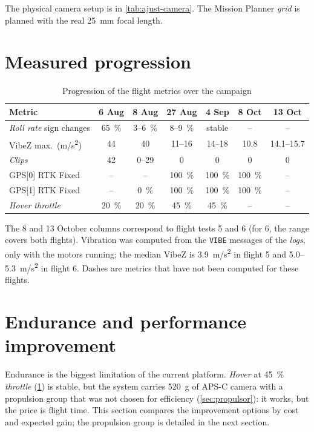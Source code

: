The physical camera setup is in \cref{tab:ajust-camera}. The Mission Planner \emph{grid} is planned with the real 25~mm focal length.

\section{Measured progression}
\label{sec:progressio-mesurada}

\begin{table}[H]
    \centering
    \caption{Progression of the flight metrics over the campaign}
    \label{tab:progressio}
    \begin{tabular}{lcccccc}
        \toprule
        Metric & 6 Aug & 8 Aug & 27 Aug & 4 Sep & 8 Oct & 13 Oct \\
        \midrule
        \emph{Roll rate} sign changes & 65~\% & 3--6~\% & 8--9~\% & stable & -- & -- \\
        VibeZ max.\ (m/s\textsuperscript{2}) & 44 & 40 & 11--16 & 14--18 & 10.8 & 14.1--15.7 \\
        \emph{Clips} & 42 & 0--29 & 0 & 0 & 0 & 0 \\
        GPS[0] RTK Fixed & -- & -- & 100~\% & 100~\% & 100~\% & -- \\
        GPS[1] RTK Fixed & -- & 0~\% & 100~\% & 100~\% & 100~\% & -- \\
        \emph{Hover throttle} & 20~\% & 20~\% & 45~\% & 45~\% & -- & -- \\
        \bottomrule
    \end{tabular}
\end{table}

The 8 and 13 October columns correspond to flight tests 5 and 6 (for 6, the range covers both flights). Vibration was computed from the \texttt{VIBE} messages of the \emph{logs}, only with the motors running; the median VibeZ is 3.9~m/s\textsuperscript{2} in flight 5 and 5.0--5.3~m/s\textsuperscript{2} in flight 6. Dashes are metrics that have not been computed for these flights.

\section{Endurance and performance improvement}
\label{sec:autonomia}

Endurance is the biggest limitation of the current platform. \emph{Hover} at 45~\% \emph{throttle} (\cref{tab:progressio}) is stable, but the system carries 520~g of APS-C camera with a propulsion group that was not chosen for efficiency (\cref{sec:propulsor}): it works, but the price is flight time. This section compares the improvement options by cost and expected gain; the propulsion group is detailed in the next section.

